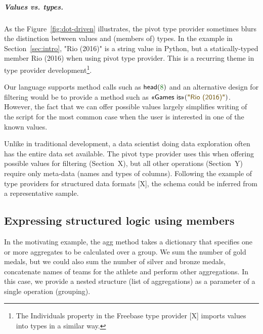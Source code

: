 \documentclass[a4paper,UKenglish]{lipics-v2016}
\theoremstyle{plain}
\theoremstyle{definition}
\newcommand{\num}[1]{\textcolor{numclr}{#1}}
\newcommand{\str}[1]{\textnormal{\textcolor{strclr}{\sffamily "#1"}}}
\newcommand{\ident}[1]{\textnormal{\sffamily #1}}
\newcommand{\qident}[1]{\textnormal{\sffamily \guillemotleft #1\guillemotright}}
\begin{document}
\subparagraph{Values vs. types.}
As the Figure~\ref{fig:dot-driven} illustrates, the pivot type provider sometimes blurs the 
distinction between values and (members of) types. In the example in Section~\ref{sec:intro},
\str{Rio (2016)} is a string value in Python, but a statically-typed member \qident{Rio (2016)}
when using pivot type provider. This is a recurring theme in type provider development\footnote{The
\ident{Individuals} property in the Freebase type provider [X] imports values into types in a similar way.}.

Our language supports method calls such as $\ident{head}(\num{8})$ and an alternative design for
filtering would be to provide a method such as $\qident{Games is}(\str{Rio (2016)})$. However,
the fact that we can offer possible values largely simplifies writing of the script for the most 
common case when the user is interested in one of the known values.

Unlike in traditional development, a data scientist doing data exploration often has the entire 
data set available. The pivot type provider uses this when offering possible values for filtering
(Section~X), but all other operations (Section~Y) require only meta-data (names and types of 
columns). Following the example of type providers for structured data formats [X], the schema could
be inferred from a representative sample.

   
\subsection{Expressing structured logic using members}
\label{sec:analysis-and}

In the motivating example, the \ident{agg} method takes a dictionary that specifies one or more 
aggregates to be calculated over a group. We sum the number of gold medals, but we could also sum
the number of silver and bronze medals, concatenate names of teams for the athlete and perform other 
aggregations. In this case, we provide a nested structure (list of aggregations) as a parameter of 
a single operation (grouping). 
\end{document}

